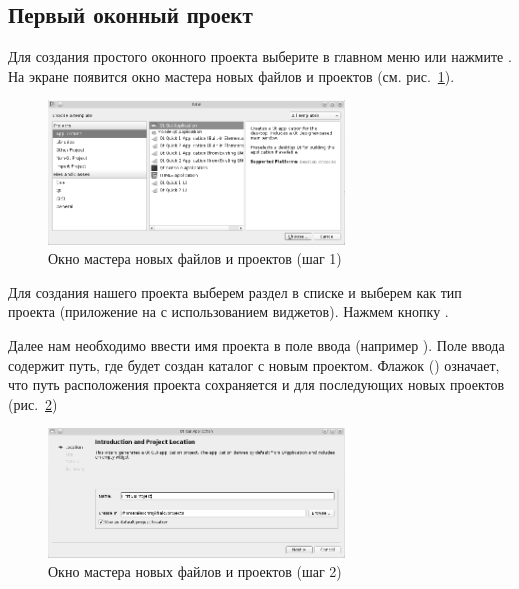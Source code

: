 \subsection[Первый оконный проект]{Первый оконный проект}

Для создания простого оконного проекта выберите в главном меню 
 или нажмите 
. На экране появится окно мастера новых файлов и проектов (см. рис.~\ref{ch11:refDrawing2}).

\begin{figure}[htb]
\begin{center}
\includegraphics[width=0.7\textwidth]{img/ris_11_3}
\caption{Окно мастера новых файлов и проектов (шаг 1)}
\label{ch11:refDrawing2}
\end{center}
\end{figure}

Для создания нашего проекта выберем раздел  в списке
 и выберем  как тип проекта 
(приложение на  с использованием виджетов). Нажмем кнопку .

Далее нам необходимо ввести имя проекта в поле ввода  (например
). Поле ввода  содержит путь, где
будет создан каталог с новым проектом. Флажок 
()
означает, что путь расположения проекта сохраняется и для последующих новых проектов (рис.~\ref{ch11:refDrawing3})

\begin{figure}[htb]
\begin{center}
\includegraphics[width=0.7\textwidth]{img/ris_11_4}
\caption{Окно мастера новых файлов и проектов (шаг 2)}
\label{ch11:refDrawing3}
\end{center}
\end{figure}

